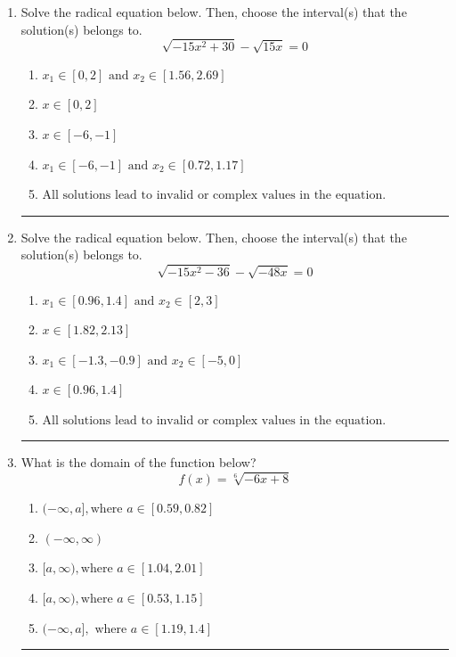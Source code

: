 \documentclass[14pt]{extbook}
\newcommand{\litem}[1]{\item#1\hspace*{-1cm}\rule{\textwidth}{0.4pt}}
\begin{document}
\begin{enumerate}
\litem{
Solve the radical equation below. Then, choose the interval(s) that the solution(s) belongs to.\[ \sqrt{-15 x^2 + 30} - \sqrt{15 x} = 0 \]\begin{enumerate}[label=\Alph*.]
\item \( x_1 \in [0, 2] \text{ and } x_2 \in [1.56,2.69] \)
\item \( x \in [0,2] \)
\item \( x \in [-6,-1] \)
\item \( x_1 \in [-6, -1] \text{ and } x_2 \in [0.72,1.17] \)
\item \( \text{All solutions lead to invalid or complex values in the equation.} \)

\end{enumerate} }
\litem{
Solve the radical equation below. Then, choose the interval(s) that the solution(s) belongs to.\[ \sqrt{-15 x^2 - 36} - \sqrt{-48 x} = 0 \]\begin{enumerate}[label=\Alph*.]
\item \( x_1 \in [0.96, 1.4] \text{ and } x_2 \in [2,3] \)
\item \( x \in [1.82,2.13] \)
\item \( x_1 \in [-1.3, -0.9] \text{ and } x_2 \in [-5,0] \)
\item \( x \in [0.96,1.4] \)
\item \( \text{All solutions lead to invalid or complex values in the equation.} \)

\end{enumerate} }
\litem{
What is the domain of the function below?\[ f(x) = \sqrt[6]{-6 x + 8} \]\begin{enumerate}[label=\Alph*.]
\item \( (-\infty, a], \text{where } a \in [0.59, 0.82] \)
\item \( (-\infty, \infty) \)
\item \( [a, \infty), \text{where } a \in [1.04, 2.01] \)
\item \( [a, \infty), \text{where } a \in [0.53, 1.15] \)
\item \( (-\infty, a], \text{ where } a \in [1.19, 1.4] \)


\end{enumerate}}
\end{enumerate}
\end{document}
